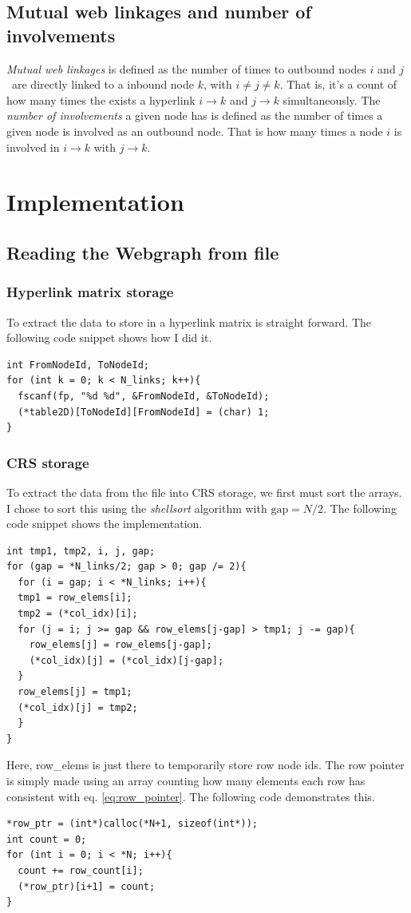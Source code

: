 \documentclass[english,notitlepage, reprint]{revtex4-1}  %
\begin{document}
\subsection*{Mutual web linkages and number of involvements}
\textit{Mutual web linkages} is defined as the number of times to outbound nodes $i$ and $j$ are directly linked to a inbound node $k$, with $i \neq j \neq k$. That is, it's a count of how many times the exists a hyperlink $i \to k$ and $j\to k$ simultaneously. The \textit{number of involvements} a given node has is defined as the number of times a given node is involved as an outbound node. That is how many times a node $i$ is involved in $i \to k$ with $j\to k$.

\section{Implementation}
\subsection*{Reading the Webgraph from file}
\subsubsection{Hyperlink matrix storage}
To extract the data to store in a hyperlink matrix is straight forward. The following code snippet shows how I did it.  
\begin{lstlisting}[style=customc]
int FromNodeId, ToNodeId;
for (int k = 0; k < N_links; k++){
  fscanf(fp, "%d %d", &FromNodeId, &ToNodeId);
  (*table2D)[ToNodeId][FromNodeId] = (char) 1;
}
\end{lstlisting}

\subsubsection{CRS storage}
To extract the data from the file into CRS storage, we first must sort the arrays. I chose to sort this using the \textit{shellsort} algorithm with $\text{gap} = N/2$. The following code snippet shows the implementation.

\begin{lstlisting}[style=customc]
int tmp1, tmp2, i, j, gap;
for (gap = *N_links/2; gap > 0; gap /= 2){
  for (i = gap; i < *N_links; i++){
  tmp1 = row_elems[i];
  tmp2 = (*col_idx)[i];
  for (j = i; j >= gap && row_elems[j-gap] > tmp1; j -= gap){
    row_elems[j] = row_elems[j-gap];
    (*col_idx)[j] = (*col_idx)[j-gap];
  }
  row_elems[j] = tmp1;
  (*col_idx)[j] = tmp2;
  }
}
\end{lstlisting}
Here, row\_elems is just there to temporarily store row node ids. The row pointer is simply made using an array counting how many elements each row has consistent with eq. \eqref{eq:row_pointer}. The following code demonstrates this.
\begin{lstlisting}[style=customc]
*row_ptr = (int*)calloc(*N+1, sizeof(int*));
int count = 0;
for (int i = 0; i < *N; i++){
  count += row_count[i];
  (*row_ptr)[i+1] = count;
}
\end{lstlisting}
\end{document}
